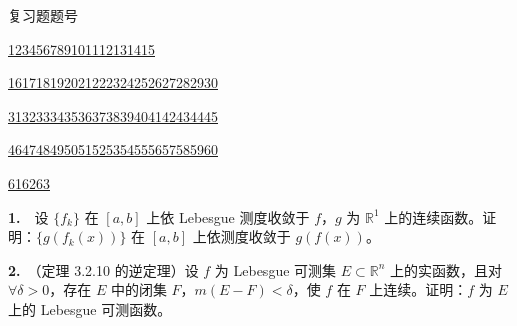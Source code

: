 \documentclass[11pt,a4paper]{article}
\begin{document}
\noindent 复习题题号\par
\noindent \hyperlink{review1}{1}\quad \hyperlink{review2}{2}\quad \hyperlink{review3}{3}\quad \hyperlink{review4}{4}\quad \hyperlink{review5}{5}\quad \hyperlink{review6}{6}\quad \hyperlink{review7}{7}\quad \hyperlink{review8}{8}\quad \hyperlink{review9}{9}\quad \hyperlink{review10}{10}\quad \hyperlink{review11}{11}\quad \hyperlink{review12}{12}\quad \hyperlink{review13}{13}\quad \hyperlink{review14}{14}\quad \hyperlink{review15}{15}\par
\noindent \hyperlink{review16}{16}\quad \hyperlink{review17}{17}\quad \hyperlink{review18}{18}\quad \hyperlink{review19}{19}\quad \hyperlink{review20}{20}\quad \hyperlink{review21}{21}\quad \hyperlink{review22}{22}\quad \hyperlink{review23}{23}\quad \hyperlink{review24}{24}\quad \hyperlink{review25}{25}\quad \hyperlink{review26}{26}\quad \hyperlink{review27}{27}\quad \hyperlink{review28}{28}\quad \hyperlink{review29}{29}\quad \hyperlink{review30}{30}\par
\noindent \hyperlink{review31}{31}\quad \hyperlink{review32}{32}\quad \hyperlink{review33}{33}\quad \hyperlink{review34}{34}\quad \hyperlink{review35}{35}\quad \hyperlink{review36}{36}\quad \hyperlink{review37}{37}\quad \hyperlink{review38}{38}\quad \hyperlink{review39}{39}\quad \hyperlink{review40}{40}\quad \hyperlink{review41}{41}\quad \hyperlink{review42}{42}\quad \hyperlink{review43}{43}\quad \hyperlink{review44}{44}\quad \hyperlink{review45}{45}\par
\noindent \hyperlink{review46}{46}\quad \hyperlink{review47}{47}\quad \hyperlink{review48}{48}\quad \hyperlink{review49}{49}\quad \hyperlink{review50}{50}\quad \hyperlink{review51}{51}\quad \hyperlink{review52}{52}\quad \hyperlink{review53}{53}\quad \hyperlink{review54}{54}\quad \hyperlink{review55}{55}\quad \hyperlink{review56}{56}\quad \hyperlink{review57}{57}\quad \hyperlink{review58}{58}\quad \hyperlink{review59}{59}\quad \hyperlink{review60}{60}\par
\noindent \hyperlink{review61}{61}\quad \hyperlink{review62}{62}\quad \hyperlink{review63}{63}\par
\par{}\hypertarget{review1}{}\noindent \textbf{1.}　设 \(\{f_k\}\) 在 \([a,b]\) 上依 Lebesgue 测度收敛于 \(f\)，\(g\) 为 \(\mathbb R^1\) 上的连续函数。证明：\(\{g(f_k(x))\}\) 在 \([a,b]\) 上依测度收敛于 \(g(f(x))\)。

\par{}\hypertarget{review2}{}\noindent \textbf{2.}　（定理 3.2.10 的逆定理）设 \(f\) 为 Lebesgue 可测集 \(E\subset\mathbb R^n\) 上的实函数，且对 \(\forall\delta>0\)，存在 \(E\) 中的闭集 \(F\)，\(m(E-F)<\delta\)，使 \(f\) 在 \(F\) 上连续。证明：\(f\) 为 \(E\) 上的 Lebesgue 可测函数。
\end{document}
